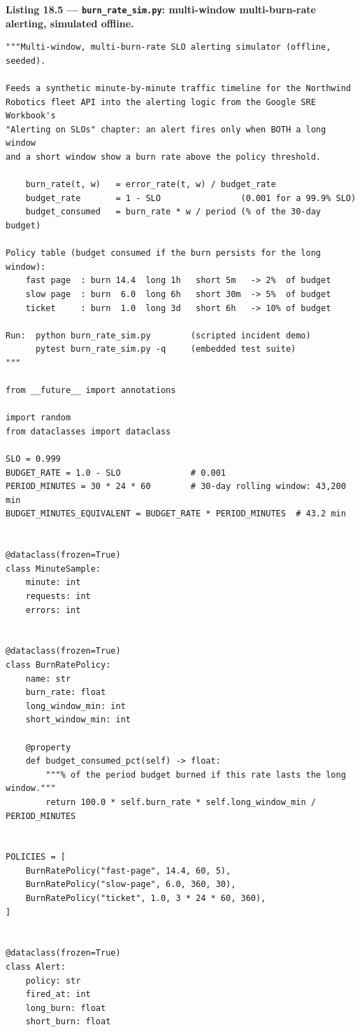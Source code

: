 \noindent\textbf{Listing 18.5 --- \texttt{burn\_rate\_sim.py}: multi-window
multi-burn-rate alerting, simulated offline.}
\label{lst:ch18-burnrate}
\begin{verbatim}
"""Multi-window, multi-burn-rate SLO alerting simulator (offline, seeded).

Feeds a synthetic minute-by-minute traffic timeline for the Northwind
Robotics fleet API into the alerting logic from the Google SRE Workbook's
"Alerting on SLOs" chapter: an alert fires only when BOTH a long window
and a short window show a burn rate above the policy threshold.

    burn_rate(t, w)   = error_rate(t, w) / budget_rate
    budget_rate       = 1 - SLO                (0.001 for a 99.9% SLO)
    budget_consumed   = burn_rate * w / period (% of the 30-day budget)

Policy table (budget consumed if the burn persists for the long window):
    fast page  : burn 14.4  long 1h   short 5m   -> 2%  of budget
    slow page  : burn  6.0  long 6h   short 30m  -> 5%  of budget
    ticket     : burn  1.0  long 3d   short 6h   -> 10% of budget

Run:  python burn_rate_sim.py        (scripted incident demo)
      pytest burn_rate_sim.py -q     (embedded test suite)
"""

from __future__ import annotations

import random
from dataclasses import dataclass

SLO = 0.999
BUDGET_RATE = 1.0 - SLO              # 0.001
PERIOD_MINUTES = 30 * 24 * 60        # 30-day rolling window: 43,200 min
BUDGET_MINUTES_EQUIVALENT = BUDGET_RATE * PERIOD_MINUTES  # 43.2 min


@dataclass(frozen=True)
class MinuteSample:
    minute: int
    requests: int
    errors: int


@dataclass(frozen=True)
class BurnRatePolicy:
    name: str
    burn_rate: float
    long_window_min: int
    short_window_min: int

    @property
    def budget_consumed_pct(self) -> float:
        """% of the period budget burned if this rate lasts the long window."""
        return 100.0 * self.burn_rate * self.long_window_min / PERIOD_MINUTES


POLICIES = [
    BurnRatePolicy("fast-page", 14.4, 60, 5),
    BurnRatePolicy("slow-page", 6.0, 360, 30),
    BurnRatePolicy("ticket", 1.0, 3 * 24 * 60, 360),
]


@dataclass(frozen=True)
class Alert:
    policy: str
    fired_at: int
    long_burn: float
    short_burn: float



\end{verbatim}
